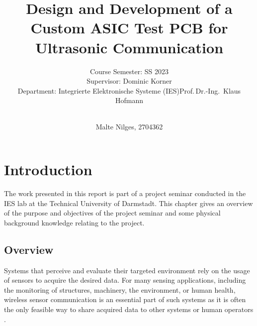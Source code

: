 \documentclass[
	english,
	ruledheaders=section, %
	class=report,%
	thesis={type=Project Seminar Report},%
	accentcolor=TUDa-1d, %
	custommargins=false,%
	marginpar=false,%
	parskip=half-,%
	fontsize=11pt,%
]{tudapub}
\begin{document}

\title{Design and Development of a Custom ASIC Test PCB for Ultrasonic Communication}
\author{\\ Malte Nilges, 2704362}



\submissiondate{\today}

\subtitle{
Course Semester: SS 2023\\
Supervisor: Dominic Korner\\
Department: Integrierte Elektronische Systeme (IES)\hfill\textbar\hfill Prof.\,Dr.-Ing.\, Klaus Hofmann}


\maketitle



\tableofcontents


\chapter{Introduction}

The work presented in this report is part of a project seminar conducted in the \gls{IES} lab at the Technical University of Darmstadt. This chapter gives an overview of the purpose and objectives of the project seminar and some physical background knowledge relating to the project.

\section{Overview}\label{sec:overview}
Systems that perceive and evaluate their targeted environment rely on the usage of sensors to acquire the desired data. For many sensing applications, including the monitoring of structures, machinery, the environment, or human health, wireless sensor communication is an essential part of such systems as it is often the only feasible way to share acquired data to other systems or human operators  \autocite{dargieFundamentalsWirelessSensor2010}.
\end{document}
